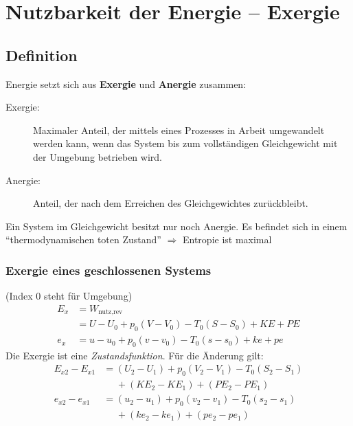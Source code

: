 
\section{Nutzbarkeit der Energie -- Exergie} %
	
	\subsection{Definition} %
		Energie setzt sich aus \textbf{Exergie} und \textbf{Anergie} zusammen:
		\begin{description}
			\item[Exergie:] Maximaler Anteil, der mittels eines Prozesses in Arbeit
				umgewandelt werden kann, wenn das System bis zum vollständigen
				Gleichgewicht mit der Umgebung betrieben wird.
			\item[Anergie:] Anteil, der nach dem Erreichen des Gleichgewichtes zurückbleibt.
		\end{description}
		
		Ein System im Gleichgewicht besitzt nur noch Anergie. Es befindet sich in
		einem ``thermodynamischen toten Zustand'' $\Rightarrow$ Entropie ist maximal
		
		\subsubsection{Exergie eines geschlossenen Systems} %
			(Index $0$ steht für Umgebung)
			\begin{align*}
				E_x &= W_\text{nutz,rev} \\
				&= U - U_0 + p_0 (V - V_0) - T_0 (S-S_0) + KE + PE \\
				e_x &= u - u_0 + p_0 (v - v_0) - T_0(s-s_0) + ke + pe
			\end{align*}
			Die Exergie ist eine \emph{Zustandsfunktion}. Für die Änderung gilt:
			\begin{align*}
				E_{x2} - E_{x1} &= (U_2 - U_1) + p_0(V_2 - V_1) - T_0(S_2 - S_1)\\ &\phantom{=} + (KE_2 - KE_1) + (PE_2 - PE_1) \\[1ex]
				e_{x2} - e_{x1} &= (u_2 - u_1) + p_0(v_2 - v_1) - T_0(s_2 - s_1)\\ &\phantom{=} + (ke_2 - ke_1) + (pe_2 - pe_1)
			\end{align*}
		
